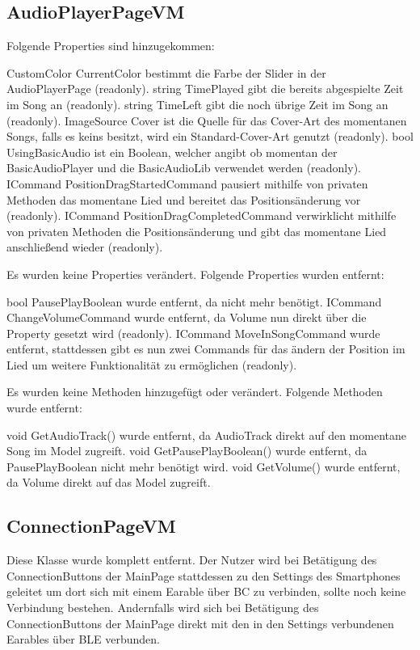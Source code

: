 \documentclass[../implementierung.tex]{subfiles}
\begin{document}
		\subsection{AudioPlayerPageVM}
			Folgende Properties sind hinzugekommen:
			\begin{itemize}
				\add CustomColor CurrentColor bestimmt die Farbe der Slider in der AudioPlayerPage (readonly).
				\add string TimePlayed gibt die bereits abgespielte Zeit im Song an (readonly). 
				\add string TimeLeft gibt die noch übrige Zeit im Song an (readonly).
				\add ImageSource Cover ist die Quelle für das Cover-Art des momentanen Songs, falls es keins besitzt, wird ein Standard-Cover-Art genutzt (readonly).
				\add bool UsingBasicAudio ist ein Boolean, welcher angibt ob momentan der BasicAudioPlayer und die BasicAudioLib verwendet werden (readonly).
				\add ICommand PositionDragStartedCommand pausiert mithilfe von privaten Methoden das momentane Lied und bereitet das Positionsänderung vor (readonly).
				\add ICommand PositionDragCompletedCommand verwirklicht mithilfe von privaten Methoden die Positionsänderung und gibt das momentane Lied anschließend wieder (readonly).
			\end{itemize}
			Es wurden keine Properties verändert. \newline
			Folgende Properties wurden entfernt:
			\begin{itemize}
				\remove bool PausePlayBoolean wurde entfernt, da nicht mehr benötigt.
				\remove ICommand ChangeVolumeCommand wurde entfernt, da Volume nun direkt über die Property gesetzt wird (readonly).
				\remove ICommand MoveInSongCommand wurde entfernt, stattdessen gibt es nun zwei Commands für das ändern der Position im Lied um weitere Funktionalität zu ermöglichen (readonly).
			\end{itemize}
			Es wurden keine Methoden hinzugefügt oder verändert. \newline
			Folgende Methoden wurde entfernt:
			\begin{itemize}
				\remove void GetAudioTrack() wurde entfernt, da AudioTrack direkt auf den momentane Song im Model zugreift.
				\remove void GetPausePlayBoolean() wurde entfernt, da PausePlayBoolean nicht mehr benötigt wird.
				\remove void GetVolume() wurde entfernt, da Volume direkt auf das Model zugreift.
			\end{itemize}
		\subsection{ConnectionPageVM}
			Diese Klasse wurde komplett entfernt. Der Nutzer wird bei Betätigung des ConnectionButtons der MainPage stattdessen zu den Settings des Smartphones geleitet um dort sich mit einem Earable über BC zu verbinden, sollte noch keine Verbindung bestehen. Andernfalls wird sich bei Betätigung des ConnectionButtons der MainPage direkt mit den in den Settings verbundenen Earables über BLE verbunden. 
\end{document}
